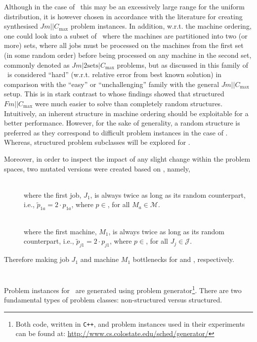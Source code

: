 Although in the case of \ this may be an excessively large range for the uniform distribution, it is however chosen in accordance with the literature \citep{Demirkol98} for creating synthesised $Jm||C_{\max}$ problem instances. In addition, w.r.t. the machine ordering, one could look into a subset of \JSP\ where the machines are partitioned into two (or more) sets, where all jobs must be processed on the machines from the first set (in some random order) before being processed on any machine in the second set, commonly denoted as $Jm|2\textrm{sets}|C_{\max}$ problems, but as discussed in \cite{orlib_swv} this family of \JSP\ is considered ``hard'' (w.r.t. relative error from best known solution) in comparison with the ``easy'' or ``unchallenging'' family with the general $Jm||C_{\max}$ setup. %
This is in stark contrast to \citet{Whitley} whose findings showed that structured $Fm||C_{\max}$ were much easier to solve than completely random structures. 
Intuitively, an inherent structure in machine ordering should be exploitable for a better performance.  However, for the sake of generality, a random structure is preferred as they correspond to difficult problem instances in the case of \JSP. Whereas, structured problem subclasses will be explored for \FSP.  

Moreover, in order to inspect the impact of any slight change within the problem spaces, two mutated versions were created based on , namely, 
\begin{description}
\item[\JrndJ]  \hfill \\ where the first job, $J_1$, is always twice as long as its random counterpart, i.e.,\linebreak
$\tilde{p}_{1a}=2\cdot p_{1a}$, where $p\in$, for all $M_a\in\mathcal{M}$. 
\item[\JrndM]  \hfill \\ where the first machine, $M_1$, is always twice as long as its random counterpart, i.e.,\linebreak
 $\tilde{p}_{j1}=2\cdot p_{j1}$, where $p\in$, for all $J_j\in\mathcal{J}$. 
\end{description}
Therefore making job $J_1$ and machine $M_1$ bottlenecks for  and , respectively.

\section{\Fsp}\label{sec:data:FSP}
Problem instances for \FSP\  are generated using \citet{Whitley} problem generator\footnote{Both code, written in \texttt{C++}, and problem instances used in their experiments can be found at: \url{http://www.cs.colostate.edu/sched/generator/}}. There are two fundamental types of problem classes: non-structured versus structured.

